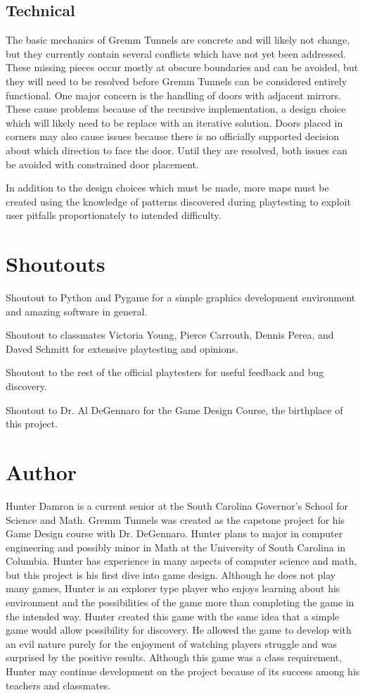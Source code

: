 \documentclass{scrreprt}
\begin{document}
		\section{Technical}
			The basic mechanics of Gremm Tunnels are concrete and will likely not change, but they currently contain several conflicts which have not yet been addressed. These missing pieces occur mostly at obscure boundaries and can be avoided, but they will need to be resolved before Gremm Tunnels can be considered entirely functional. One major concern is the handling of doors with adjacent mirrors. These cause problems because of the recursive implementation, a design choice which will likely need to be replace with an iterative solution. Doors placed in corners may also cause issues because there is no officially supported decision about which direction to face the door. Until they are resolved, both issues can be avoided with constrained door placement. 
			
			In addition to the design choices which must be made, more maps must be created using the knowledge of patterns discovered during playtesting to exploit user pitfalls proportionately to intended difficulty. 
		
	\chapter{Shoutouts}
		Shoutout to Python and Pygame for a simple graphics development environment and amazing software in general. 
		
		Shoutout to classmates Victoria Young, Pierce Carrouth, Dennis Perea, and Daved Schmitt for extensive playtesting and opinions. 
		
		Shoutout to the rest of the official playtesters for useful feedback and bug discovery.
		
		Shoutout to Dr. Al DeGennaro for the Game Design Course, the birthplace of this project.
		
	\chapter{Author}
		Hunter Damron is a current senior at the South Carolina Governor's School for Science and Math. Gremm Tunnels was created as the capstone project for his Game Design course with Dr. DeGennaro. Hunter plans to major in computer engineering and possibly minor in Math at the University of South Carolina in Columbia. Hunter has experience in many aspects of computer science and math, but this project is his first dive into game design. Although he does not play many games, Hunter is an explorer type player who enjoys learning about his environment and the possibilities of the game more than completing the game in the intended way. Hunter created this game with the same idea that a simple game would allow possibility for discovery. He allowed the game to develop with an evil nature purely for the enjoyment of watching players struggle and was surprised by the positive results. Although this game was a class requirement, Hunter may continue development on the project because of its success among his teachers and classmates. 
	
\end{document}

